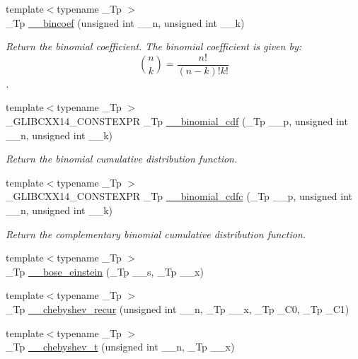 \begin{DoxyCompactItemize}
{\footnotesize template$<$typename \+\_\+\+Tp $>$ }\\\+\_\+\+Tp \hyperlink{namespacestd_1_1____detail_ab0888bd3901e6501b1f451d6adcf967a}{\+\_\+\+\_\+bincoef} (unsigned int \+\_\+\+\_\+n, unsigned int \+\_\+\+\_\+k)
\begin{DoxyCompactList}\small\item\em Return the binomial coefficient. The binomial coefficient is given by\+: \[ \binom{n}{k} = \frac{n!}{(n-k)! k!} \]. \end{DoxyCompactList}\item 
{\footnotesize template$<$typename \+\_\+\+Tp $>$ }\\\+\_\+\+G\+L\+I\+B\+C\+X\+X14\+\_\+\+C\+O\+N\+S\+T\+E\+X\+P\+R \+\_\+\+Tp \hyperlink{namespacestd_1_1____detail_afecc4328cf5d707a7ff08b6da33d257a}{\+\_\+\+\_\+binomial\+\_\+cdf} (\+\_\+\+Tp \+\_\+\+\_\+p, unsigned int \+\_\+\+\_\+n, unsigned int \+\_\+\+\_\+k)
\begin{DoxyCompactList}\small\item\em Return the binomial cumulative distribution function. \end{DoxyCompactList}\item 
{\footnotesize template$<$typename \+\_\+\+Tp $>$ }\\\+\_\+\+G\+L\+I\+B\+C\+X\+X14\+\_\+\+C\+O\+N\+S\+T\+E\+X\+P\+R \+\_\+\+Tp \hyperlink{namespacestd_1_1____detail_a7ed292577794cc81c29830b69afcbd15}{\+\_\+\+\_\+binomial\+\_\+cdfc} (\+\_\+\+Tp \+\_\+\+\_\+p, unsigned int \+\_\+\+\_\+n, unsigned int \+\_\+\+\_\+k)
\begin{DoxyCompactList}\small\item\em Return the complementary binomial cumulative distribution function. \end{DoxyCompactList}\item 
{\footnotesize template$<$typename \+\_\+\+Tp $>$ }\\\+\_\+\+Tp \hyperlink{namespacestd_1_1____detail_a4c199ebf92e53a3ae9c27c2c79d65e21}{\+\_\+\+\_\+bose\+\_\+einstein} (\+\_\+\+Tp \+\_\+\+\_\+s, \+\_\+\+Tp \+\_\+\+\_\+x)
\item 
{\footnotesize template$<$typename \+\_\+\+Tp $>$ }\\\+\_\+\+Tp \hyperlink{namespacestd_1_1____detail_a3a893b4c60f3245af5db4ca792c4b2cf}{\+\_\+\+\_\+chebyshev\+\_\+recur} (unsigned int \+\_\+\+\_\+n, \+\_\+\+Tp \+\_\+\+\_\+x, \+\_\+\+Tp \+\_\+\+C0, \+\_\+\+Tp \+\_\+\+C1)
\item 
{\footnotesize template$<$typename \+\_\+\+Tp $>$ }\\\+\_\+\+Tp \hyperlink{namespacestd_1_1____detail_af4ba1015e914cdd23d9e5d2be69740c1}{\+\_\+\+\_\+chebyshev\+\_\+t} (unsigned int \+\_\+\+\_\+n, \+\_\+\+Tp \+\_\+\+\_\+x)

\end{DoxyCompactItemize}
